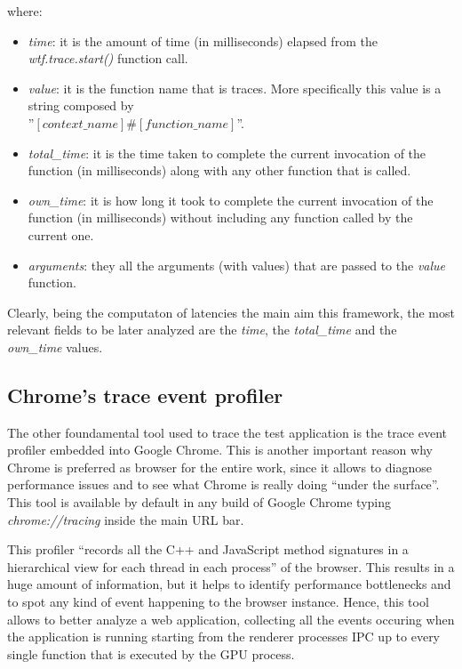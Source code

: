 where:
\begin{itemize}
    \item \emph{time}: it is the amount of time (in milliseconds) elapsed from the
        \emph{wtf.trace.start()} function call.
    \item \emph{value}: it is the function name that is traces. More specifically this
        value is a string composed by\\
        ''\([context\_name]\#[function\_name]\)''.
    \item \emph{total\_time}: it is the time taken to complete the current invocation
        of the function (in milliseconds) along with any other function that
        is called.
    \item \emph{own\_time}: it is how long it took to complete the current invocation
        of the function (in milliseconds) without including any function called by
        the current one.
    \item \emph{arguments}: they all the arguments (with values) that are passed
        to the \emph{value} function.
\end{itemize}

Clearly, being the computaton of latencies the main aim this framework, the most
relevant fields to be later analyzed are the \emph{time}, the \emph{total\_time}
and the \emph{own\_time} values.


\subsection{Chrome's trace event profiler}
The other foundamental tool used to trace the test application is the trace
event profiler embedded into Google Chrome. This is another important reason why
Chrome is preferred as browser for the entire work, since it allows to diagnose
performance issues and to see what Chrome is really doing ``under the surface''.
This tool is available by default in any build of Google Chrome typing
\emph{chrome://tracing} inside the main URL bar.

This profiler ``records all the C++ and JavaScript method signatures in a
hierarchical view for each thread in each process'' of the browser. This results
in a huge amount of information, but it helps to identify performance bottlenecks
and to spot any kind of event happening to the browser instance. Hence, this tool
allows to
better analyze a web application, collecting all the events occuring when the
application is running starting from the renderer processes IPC up to every single
function that is executed by the GPU process.


